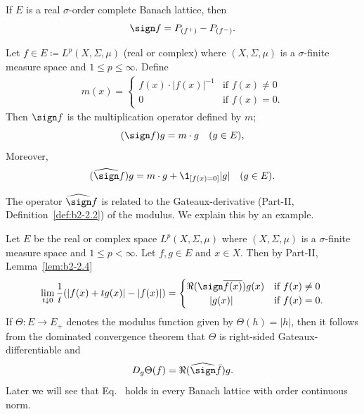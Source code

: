 If\/ $E$ is a real $\sigma$-order complete Banach lattice, then
\begin{equation}\label{eq:c2-2.5}
	\sign f = P_{(f^{+})} - P_{(f^{-})}.
\end{equation}
\begin{example}\label{ex:c2-2.2}
%
Let $f \in E \coloneqq L^p(X,\Sigma,\mu)$ (real or complex) where $(X,\Sigma,\mu)$ is a $\sigma$-finite measure space and $1 \leq p \leq \infty$.
Define  
\begin{align*}
	m(x) = 
	\begin{cases}
        f(x)\cdot|f(x)|^{-1} & \text{if }  f(x)   \neq 0 \\ 
    	0 & \text{if } f(x) = 0.
	\end{cases}
\end{align*}
Then $\sign f$ is the multiplication operator defined by $m$; \ie
\[
	(\sign f)g = m \cdot g \quad (g \in E), 
\]
Moreover, 
\[
	(\widehat{\sign} f)g = m \cdot g + \1_{[f(x)=0]}|g| \quad (g \in E).
\]
\end{example}
The operator $\widehat{\sign} f$ is related to the Gateaux-derivative (Part-II, Definition~\ref{def:b2-2.2}) of the modulus.
We explain this by an example.
\begin{example}\label{ex:c2-2.3}
%
Let $E$ be the real or complex space $L^p(X,\Sigma,\mu)$ where $(X,\Sigma,\mu)$ is a $\sigma$-finite measure space and $1 \leq p < \infty$.
Let $f,g \in E$ and $x \in X$.
Then by Part-II, Lemma~\ref{lem:b2-2.4}
\begin{align*}
\lim_{t \downarrow 0} \frac{1}{t} (|f(x)+tg(x)|-|f(x)|) = 
\begin{cases}
    \Re (\sign \overline{f(x)})g(x) & \text{if } f(x) \neq 0 \\
    \ \quad\quad|g(x)| & \text{if } f(x) = 0.
\end{cases}
\end{align*}
If\/ $\Theta \colon E \to E_{+}$ denotes the modulus function given by $\Theta(h) = |h|$, then it follows from the dominated convergence theorem that $\Theta$ is right-sided Gateaux-differentiable and
\begin{equation}\label{eq:c2-2.6}
D_{g}\Theta(f) = \Re(\widehat{\sign} \bar{f})g.
\end{equation}
Later we will see that Eq.~   holds in every Banach lattice with order continuous norm.
\end{example}
